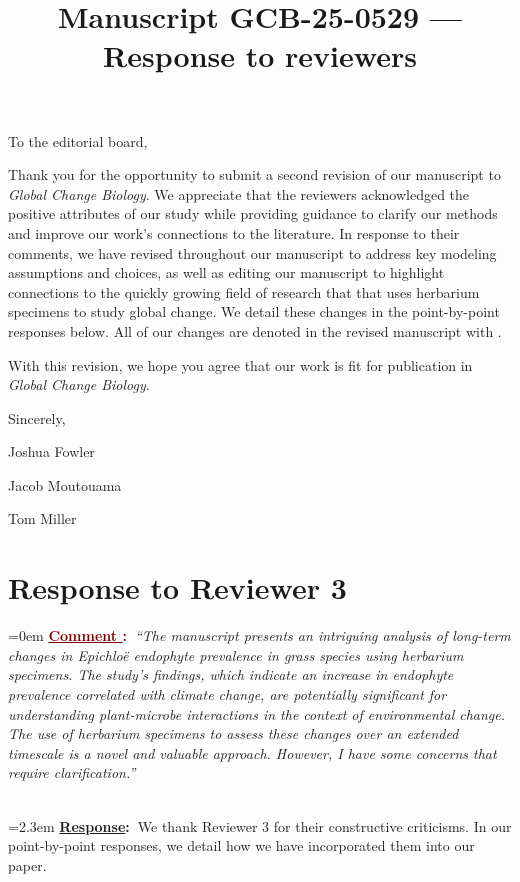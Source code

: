 \documentclass[12pt]{article}
\newcounter{cN}
\newcommand{\comment}[1]{
	\vspace{2em}
	\refstepcounter{cN} %
	\noindent \hangindent=0em \textbf{\textcolor{Maroon}{\uline{Comment \thecN}:~}}\emph{``#1''}
	}
\newcommand{\response}[1]{
	\\[0.25em]
	\hangindent=2.3em \textbf{\textcolor{NavyBlue}{\uline{Response}:~}}#1
	}
\newcommand{\revise}[1]{{\color{Mahogany}{#1}}}
\newcommand{\linesref}[2]{
		\\[0.25em]
	\hangindent=2.3em {\color{Mahogany} Line(s): \ref{#1} - \ref{#2}}
}
\begin{document}
\title{Manuscript GCB-25-0529 --- Response to reviewers}

\maketitle
\noindent To the editorial board,


Thank you for the opportunity to submit a second revision of our manuscript to \emph{Global Change Biology}. 
We appreciate that the reviewers acknowledged the positive attributes of our study while providing guidance to clarify our methods and improve our work's connections to the literature. 
In response to their comments, we have revised throughout our manuscript to address key modeling assumptions and choices, as well as editing our manuscript to highlight connections to the quickly growing field of research that that uses herbarium specimens to study global change. We detail these changes in the point-by-point responses below.
All of our changes are denoted in the revised manuscript with \revise{Mahogany font}. 

With this revision, we hope you agree that our work is fit for publication in \emph{Global Change Biology}.


\vspace{2em}
Sincerely,

Joshua Fowler

Jacob Moutouama

Tom Miller



\newpage

\section{Response to Reviewer 3}
\vspace{-2em}




\comment{The manuscript presents an intriguing analysis of long-term changes in Epichloë endophyte prevalence in grass species using herbarium specimens. The study's findings, which indicate an increase in endophyte prevalence correlated with climate change, are potentially significant for understanding plant-microbe interactions in the context of environmental change. The use of herbarium specimens to assess these changes over an extended timescale is a novel and valuable approach. However, I have some concerns that require clarification.}
\response{We thank Reviewer 3 for their constructive criticisms. In our point-by-point responses, we detail how we have incorporated them into our paper.}
\end{document}
